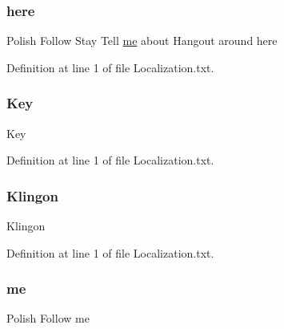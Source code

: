 \subsubsection{\texorpdfstring{here}{here}}
{\footnotesize\ttfamily Polish Follow Stay Tell \mbox{\hyperlink{_blooms_01_animal_01_husbandry_2_config_2_localization_8txt_a290fbecf7c016b09bc675718400d6fca}{me}} about Hangout around here}



Definition at line 1 of file Localization.\+txt.

\mbox{\label{_blooms_01_animal_01_husbandry_2_config_2_localization_8txt_ab3c7af4820830f9166ede9e5623c4e73}} 
\subsubsection{\texorpdfstring{Key}{Key}}
{\footnotesize\ttfamily Key}



Definition at line 1 of file Localization.\+txt.

\mbox{\label{_blooms_01_animal_01_husbandry_2_config_2_localization_8txt_ae413412a6184b4aa46db8a189cad08d9}} 
\subsubsection{\texorpdfstring{Klingon}{Klingon}}
{\footnotesize\ttfamily Klingon}



Definition at line 1 of file Localization.\+txt.

\mbox{\label{_blooms_01_animal_01_husbandry_2_config_2_localization_8txt_aa0011d8b60c7cc57ec5a5a67d8649e30}} 
\subsubsection{\texorpdfstring{me}{me}}
{\footnotesize\ttfamily Polish Follow me}



